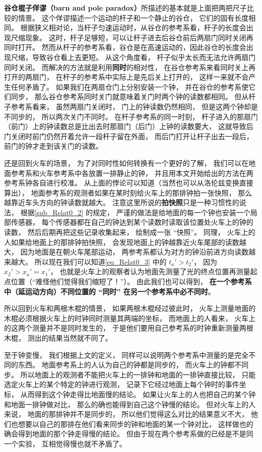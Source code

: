 \textbf{谷仓棍子佯谬（barn and pole paradox）}所描述的基本就是上面把两把尺子比较的情景。 这个佯谬描述一个运动的杆子和一个静止的谷仓， 它们的固有长度相同。 根据狭义相对论，当杆子匀速运动时，从谷仓的参考系看，杆子的长度会出现尺缩现象。 这时，杆子足够短，可以让杆子进去后谷仓前后两扇门同时关闭再同时打开。 然而从杆子的参考系看，谷仓是在高速运动的，因此谷仓的长度会出现尺缩，导致谷仓看上去更短。 从这个角度看， 杆子似乎太长而无法允许两扇门同时关闭。 而解决的方法就是利用\textbf{同时}的相对性， 在谷仓参考系来看同时关上再打开的两扇门， 在杆子的参考系中实际上是先后关上打开的， 这样一来就不会产生任何矛盾了。 如果我们在两扇仓门上分别安装一个钟， 并在谷仓的参考系使它们同步， 那么谷仓参考系同时关门就意味着关门时两个钟的读数都相同。 但从杆子参考系看来， 虽然两扇门关闭时， 门上的钟读数仍然相同， 但是这两个钟却是不同步的， 所以两次关门不同时。 在杆子参考系的同一时刻， 杆子进入的那扇门（前门）上的钟读数总是比出去时那扇门（后门）上钟的读数要大， 这就导致后门关闭时前门仍然开着允许一段杆子留在外面， 而后门打开让杆子出去一段后， 前门的钟才走到该关门的读数。

还是回到火车的场景， 为了对同时性如何转换有一个更好的了解， 我们可以在地面参考系和火车参考系中各放置一排静止的钟， 并且用本文开始给出的方法在两参考系钟各自进行校准。 从上面的悖论可以知道（当然也可以从洛伦兹变换直接算出）， 地面参考系的观测者如果在某时刻给火车上的那排钟拍一张快照， 那么越靠近车头方向的钟读数就越大。 注意这里所说的\textbf{拍快照}只是一种习惯性的说法， 根据\autoref{sub_Relat0_2} 的规定， 严谨的做法是给地面的每一个钟也安装一个局部传感器， 每个传感器都在自己的钟达到某个读数时读取该位置处火车上的钟的读数， 然后后期再把这些记录收集起来， 绘制成一张 “快照”。 同理， 火车上的人如果给地面上的那排钟拍快照， 会发现地面上的钟越靠近火车尾部的读数越大， 因为地面是在朝火车尾部运动， 两参考系都认为对方的钟沿前进方向读数越来越大。 所以现在我们可以知道\autoref{eq_Relat0_3} 中的 $t_a' > t_2'$， 因为 $x_2' > x_a' = x_1'$， 也就是火车上的观察者认为地面先测量了光的终点位置再测量起点位置（“难怪他们觉得我们缩短了！”）。 由此我们也可以得到， \textbf{在一个参考系中（延运动方向）不同位置的 “同时” 在另一个参考系中必不同时}。

所以回到火车和两根木棍的情景， 如果两根木棍经过彼此时， 火车上测量地面的木棍必须根据火车上的时钟同时测量其两端的坐标， 而地面上的人看来， 火车上的这两个测量并不是同时发生的， 于是他们要用自己参考系的时钟重新测量两根木棍， 测出的结果当然就不同了。

至于钟变慢， 我们根据上文的定义， 同样可以说明两个参考系中测量的是完全不同的东西。 地面参考系上的人认为自己的钟都是同步的， 而火车上的钟都不同步。 所以地面上的观测者不能把火车上的一排钟和地面的一排钟直接比较， 只能选定火车上的某个特定的钟进行观测， 记录下它经过地面上每个钟时的事件坐标， 从而得到这个钟走得比地面慢的结论。 如果让火车上的人也把自己的某个钟和地面一排钟做对比， 那么的确也能得到自己这个钟慢的结论。 但对火车上的人来说， 地面的那排钟并不是同步的， 所以他们觉得这么对比的结果意义不大， 他们也想要以自己的那排在他们看来同步的钟和地面的某一个钟对比， 这样做也的确会得到地面的那个钟走得慢的结论。 但由于现在两个参考系做的已经是不是同一个实验， 互相觉得慢也就不矛盾了。

